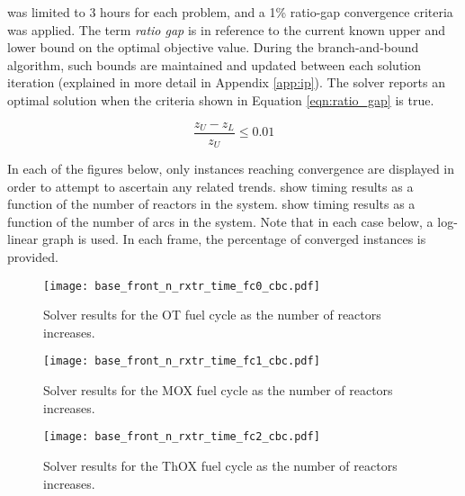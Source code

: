 \cbc was limited to 3 hours for each problem, and a 1\% ratio-gap convergence
criteria was applied. The term \textit{ratio gap} is in reference to the current
known upper and lower bound on the optimal objective value. During the
branch-and-bound algorithm, such bounds are maintained and updated between each
solution iteration (explained in more detail in Appendix \ref{app:ip}). The
solver reports an optimal solution when the criteria shown in Equation
\ref{eqn:ratio_gap} is true.

\begin{equation}\label{eqn:ratio_gap}
\frac{z_U - z_L}{z_U} \leq 0.01
\end{equation}

In each of the figures below, only instances reaching convergence are displayed
in order to attempt to ascertain any related
trends. 
show timing results as a function of the number of reactors in the
system. 
show timing results as a function of the number of arcs in the system. Note that
in each case below, a log-linear graph is used. In each frame, the percentage of
converged instances is provided.

\begin{figure}[h!]
  \begin{center}
    \texttt{[image: base\_front\_n\_rxtr\_time\_fc0\_cbc.pdf]}
    \caption{
      \label{fig:base_front_n_rxtr_time_fc0_cbc}
      \cbc Solver results for the OT fuel cycle as the number of reactors
      increases.
      }
  \end{center}
\end{figure}

\begin{figure}[h!]
  \begin{center}
    \texttt{[image: base\_front\_n\_rxtr\_time\_fc1\_cbc.pdf]}
    \caption{
      \label{fig:base_front_n_rxtr_time_fc1_cbc}
      \cbc Solver results for the MOX fuel cycle as the number of reactors
      increases.
      }
  \end{center}
\end{figure}

\begin{figure}[h!]
  \begin{center}
    \texttt{[image: base\_front\_n\_rxtr\_time\_fc2\_cbc.pdf]}
    \caption{
      \label{fig:base_front_n_rxtr_time_fc2_cbc}
      \cbc Solver results for the ThOX fuel cycle as the number of reactors
      increases.
      }
  \end{center}
\end{figure}

